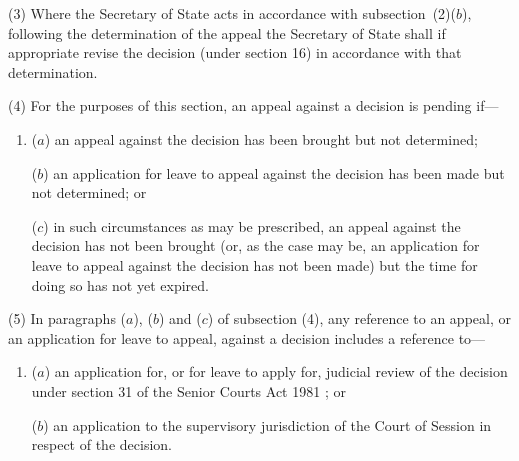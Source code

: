 \documentclass[12pt,a4paper]{article}
\begin{document}
\begin{sloppypar}
(3) Where the 
Secretary of State  %
acts in accordance with subsection~(2)($b$), following the determination of the appeal 
the Secretary of State  %
shall if appropriate revise 
the  %
decision (under section 16) in accordance with that determination.
\end{sloppypar}

(4) For the purposes of this section, an appeal against a decision is pending if—
\begin{enumerate}\item[]
($a$) an appeal against the decision has been brought but not determined;

($b$) an application for leave to appeal against the decision has been made but not determined; or

($c$) in such circumstances as may be prescribed, an appeal against the decision has not been brought (or, as the case may be, an application for leave to appeal against the decision has not been made) but the time for doing so has not yet expired.
\end{enumerate}

(5) In paragraphs ($a$), ($b$) and ($c$) of subsection (4), any reference to an appeal, or an application for leave to appeal, against a decision includes a reference to—
\begin{enumerate}\item[]
($a$) an application for, or for leave to apply for, judicial review of the decision under section 31 of the 
Senior Courts Act 1981%
; or

($b$) an application to the supervisory jurisdiction of the Court of Session in respect of the decision.
\end{enumerate}

\end{document}
